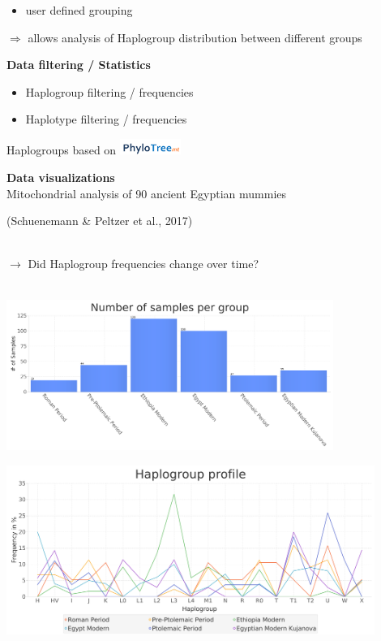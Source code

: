 \documentclass[a0paper,portrait]{baposter}
\begin{document}
\begin{poster}
{\begin{minipage}[t]{0.24\textwidth}
\begin{itemize}[leftmargin=*]
			(e.g. time period, location)
			\item user defined grouping
		\end{itemize}
		$\Rightarrow$ allows analysis of Haplogroup distribution between different groups
	\end{minipage}
		\hspace{0.5em}
	\begin{minipage}[t]{0.24\textwidth}
		\textbf{Data filtering / Statistics}
		\begin{itemize}[leftmargin=*]
			\item Haplogroup filtering / frequencies
			\item Haplotype filtering / frequencies
		\end{itemize}
		Haplogroups based on \includegraphics[width=2cm]{figures/phylotree.png}
	\end{minipage}

	\vspace{1em}
	
	\begin{minipage}[t]{0.7\textwidth}
	\textbf{Data visualizations}\\
Mitochondrial analysis of 90 ancient Egyptian mummies \begin{footnotesize}(Schuenemann \& Peltzer et al., 2017)\end{footnotesize}\\
$\rightarrow$ Did Haplogroup frequencies change over time?\\
\\
	\begin{minipage}{0.5\textwidth}
		\includegraphics[width=0.8\textwidth]{figures/group_sizes2.png}
	\end{minipage}
	\begin{minipage}{0.5\textwidth}
			\includegraphics[width=0.9\textwidth]{figures/profile.png}
	\end{minipage}


\end{minipage}}
\end{poster}
\end{document}
